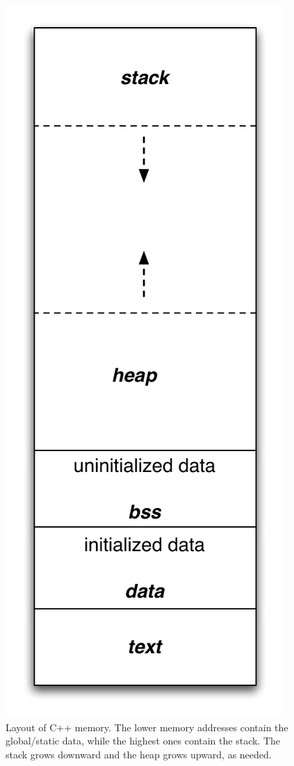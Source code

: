 \documentclass[12pt]{article}
\begin{document}
\begin{figure}
\centering \includegraphics[scale=0.5]{figures/memory_layout.pdf}
\caption{Layout of C++ memory.  The lower memory addresses contain the
  global/static data, while the highest ones contain the stack.  The
  stack grows downward and the heap grows upward, as needed.}
\end{figure}
\end{document}
